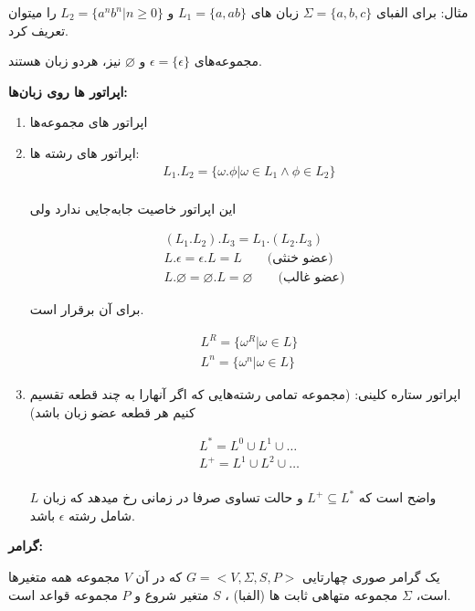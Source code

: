 \begin{example}
    مثال: برای الفبای 
    $\Sigma = \{a, b, c\}$
    زبان های
    $L_1 = \{a, ab\}$
    و
    $L_2 = \{a^nb^n| n \geq 0\}$
    را میتوان تعریف کرد.
\end{example}

مجموعه‌های 
$\epsilon = \{\epsilon\}$
و
$\varnothing$
نیز،‌ هردو زبان هستند.

\textbf{اپراتور ها روی زبان‌ها:}
\begin{enumerate}
    \item اپراتور های مجموعه‌ها
    \item اپراتور های رشته ها: 
    \begin{align*}
        L_1.L_2 = \{\omega . \phi | \omega \in L_1 \wedge \phi \in L_2\}\\
    \end{align*}

    این اپراتور خاصیت جابه‌جایی ندارد ولی

    \begin{align*}
        &(L_1.L_2).L_3 = L_1.(L_2.L_3) \\
        &L.\epsilon = \epsilon. L = L \qquad \text{(عضو خنثی)}\\
        &L.\varnothing = \varnothing.L = \varnothing\qquad \text{(عضو غالب)}
    \end{align*}

    برای آن برقرار است.

    \begin{align*}
        L^R = \{\omega^R | \omega \in L\}\\
        L^n = \{\omega^n | \omega \in L\}
    \end{align*}

    \item اپراتور ستاره کلینی:
    (مجموعه تمامی رشته‌هایی که اگر آنهارا به چند قطعه تقسیم کنیم هر قطعه عضو زبان باشد)

    \begin{align*}
        L^* = L^0 \cup L^1 \cup \dots\\
        L^+ = L^1 \cup L^2 \cup \dots\\
    \end{align*}

    واضح است که 
    $L^+ \subseteq L^*$
    و حالت تساوی صرفا در زمانی رخ میدهد که زبان
    $L$
    شامل رشته
    $\epsilon$
    باشد.
\end{enumerate}

\textbf{
    گرامر:
}

یک گرامر صوری چهارتایی
$G = <V, \Sigma, S, P>$
که در آن
$V$
مجموعه همه متغیر‌ها است،
$\Sigma$
مجموعه متهاهی ثابت ها
(الفبا)
،
$S$
متغیر شروع و 
$P$
مجموعه قواعد است.

